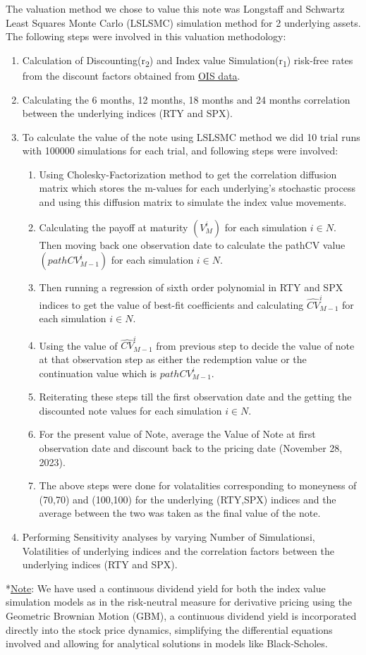 \documentclass[12pt,a4paper]{article}
\begin{document}
\clearpage  %

The valuation method we chose to value this note was Longstaff and Schwartz Least Squares Monte Carlo (LSLSMC) simulation method for 2 underlying assets. The following steps were involved in this valuation methodology:
\begin{enumerate}
\item Calculation of Discounting(r\textsubscript{2}) and Index value Simulation(r\textsubscript{1}) risk-free rates from the discount factors obtained from \hyperref[app:ois]{OIS data}.
\item Calculating the 6 months, 12 months, 18 months and 24 months correlation between the underlying indices (RTY and SPX).
\item To calculate the value of the note using LSLSMC method we did 10 trial runs with 100000 simulations for each trial, and following steps were involved:
	\begin{enumerate}
	\item Using Cholesky-Factorization method to get the correlation diffusion matrix which stores the m-values for each underlying's stochastic process and using this diffusion matrix to simulate the index value movements.
	\item Calculating the payoff at maturity $(V^i_M)$ for each simulation $i \in N$. Then moving back one observation date to calculate the pathCV value $(pathCV^i_{M-1})$ for each simulation $i \in N$.
	\item Then running a regression of sixth order polynomial in RTY and SPX indices to get the value of best-fit coefficients and calculating $\hat{CV}^i_{M-1}$ for each simulation $i \in N$.
	\item Using the value of $\hat{CV}^i_{M-1}$ from previous step to decide the value of note at that observation step as either the redemption value or the continuation value which is $pathCV^i_{M-1}$.
	\item Reiterating these steps till the first observation date and the getting the discounted note values for each simulation $i \in N$.
	\item For the present value of Note, average the Value of Note at first observation date and discount back to the pricing date (November 28, 2023).
	\item The above steps were done for volatalities corresponding to moneyness of (70,70) and (100,100) for the underlying (RTY,SPX) indices and the average between the two was taken as the final value of the note.
	\end{enumerate}
\item Performing Sensitivity analyses by varying Number of Simulationsi, Volatilities of underlying indices and the correlation factors between the underlying indices (RTY and SPX).
\end{enumerate}
*\underline{Note}:  We have used a continuous dividend yield for both the index value simulation models as in the risk-neutral measure for derivative pricing using the Geometric Brownian Motion (GBM), a continuous dividend yield is incorporated directly into the stock price dynamics, simplifying the differential equations involved and allowing for analytical solutions in models like Black-Scholes.
\end{document}

